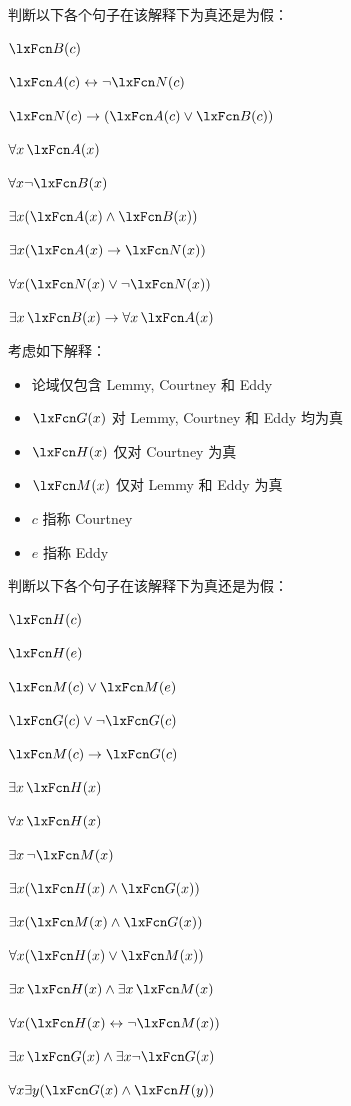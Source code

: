判断以下各个句子在该解释下为真还是为假：


\begin{compactlist}
\item $\atom{B}{c} $
\item $\atom{A}{c}  \eiff \enot \atom{N}{c}$
\item $\atom{N}{c}  \eif (\atom{A}{c} \eor \atom{B}{c})$
\item $\forall x\, \atom{A}{x}$
\item $\forall x \enot \atom{B}{x}$
\item $\exists x(\atom{A}{x} \eand \atom{B}{x})$
\item $\exists x(\atom{A}{x} \eif \atom{N}{x})$
\item $\forall x(\atom{N}{x} \eor \enot \atom{N}{x})$
\item $\exists x\, \atom{B}{x} \eif \forall x\, \atom{A}{x}$
\end{compactlist}

\problempart
\label{pr.TorF2}
考虑如下解释：


\begin{itemize}
		\item 论域仅包含 Lemmy, Courtney 和 Eddy
		\item $\atom{G}{x}$ 对 Lemmy, Courtney 和 Eddy 均为真
		\item $\atom{H}{x}$ 仅对 Courtney 为真
		\item $\atom{M}{x}$ 仅对 Lemmy 和 Eddy 为真
		\item $c$ 指称 Courtney
		\item $e$ 指称 Eddy
	\end{itemize}


判断以下各个句子在该解释下为真还是为假：

\begin{compactlist}
\item $\atom{H}{c} $
\item $\atom{H}{e} $
\item $\atom{M}{c}  \eor \atom{M}{e}$
\item $\atom{G}{c}  \eor \enot \atom{G}{c}$
\item $\atom{M}{c}  \eif \atom{G}{c}$
\item $\exists x\, \atom{H}{x}$
\item $\forall x\, \atom{H}{x}$
\item $\exists x\, \enot \atom{M}{x}$
\item $\exists x(\atom{H}{x} \eand \atom{G}{x})$
\item $\exists x(\atom{M}{x} \eand \atom{G}{x})$
\item $\forall x(\atom{H}{x} \eor \atom{M}{x})$
\item $\exists x\, \atom{H}{x} \eand \exists x\, \atom{M}{x}$
\item $\forall x(\atom{H}{x} \eiff \enot \atom{M}{x})$
\item $\exists x\, \atom{G}{x} \eand \exists x \enot \atom{G}{x}$
\item $\forall x\exists y(\atom{G}{x} \eand \atom{H}{y})$
\end{compactlist}

